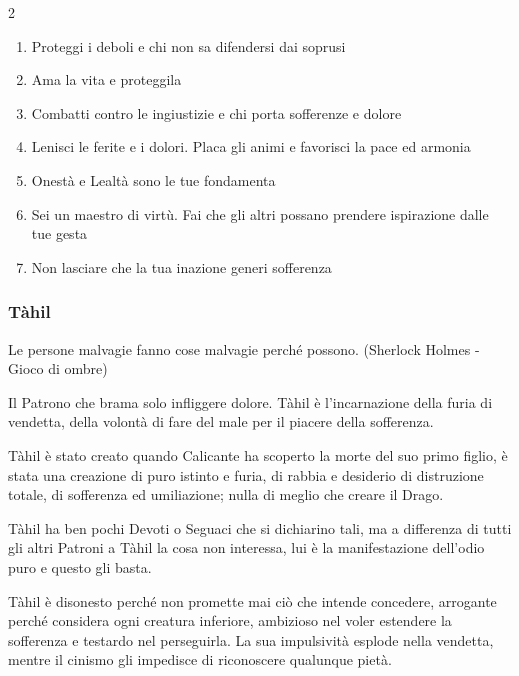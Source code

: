 \begin{multicols}{2}
\begin{enumerate}[leftmargin=*] \setlength{\itemsep}{0pt}
\item Proteggi i deboli e chi non sa difendersi dai soprusi
\item Ama la vita e proteggila
\item Combatti contro le ingiustizie e chi porta sofferenze e dolore
\item Lenisci le ferite e i dolori. Placa gli animi e favorisci la pace ed armonia
\item Onestà e Lealtà sono le tue fondamenta
\item Sei un maestro di virtù. Fai che gli altri possano prendere ispirazione dalle tue gesta
\item Non lasciare che la tua inazione generi sofferenza
\end{enumerate}

\subsubsection{Tàhil}\label{tahil}\hypertarget{tahil}{}

\begin{enfasi}{
Le persone malvagie fanno cose malvagie perché possono. (Sherlock Holmes - Gioco di ombre)
}\end{enfasi}

Il Patrono che brama solo infliggere dolore. Tàhil è l'incarnazione della furia di vendetta, della volontà di fare del male per il piacere della sofferenza.

Tàhil è stato creato quando Calicante ha scoperto la morte del suo primo figlio, è stata una creazione di puro istinto e furia, di rabbia e desiderio di distruzione totale, di sofferenza ed umiliazione; nulla di meglio che creare il Drago.

Tàhil ha ben pochi Devoti o Seguaci che si dichiarino tali, ma a differenza di tutti gli altri Patroni a Tàhil la cosa non interessa, lui è la manifestazione dell'odio puro e questo gli basta.

Tàhil è disonesto perché non promette mai ciò che intende concedere, arrogante perché considera ogni creatura inferiore, ambizioso nel voler estendere la sofferenza e testardo nel perseguirla. La sua impulsività esplode nella vendetta, mentre il cinismo gli impedisce di riconoscere qualunque pietà.


\end{multicols}
